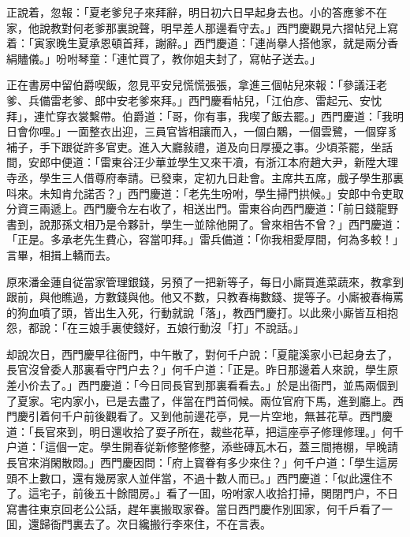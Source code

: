 正說着，忽報：「夏老爹兒子來拜辭，明日初六日早起身去也。小的答應爹不在家，他說教對何老爹那裏說聲，明早差人那邊看守去。」西門慶觀見六摺帖兒上寫着：「寅家晚生夏承恩頓首拜，謝辭。」西門慶道：「連尚擧人搭他家，就是兩分香絹贐儀。」吩咐琴童：「連忙買了，教你姐夫封了，寫帖子送去。」

正在書房中留伯爵喫飯，忽見平安兒慌慌張張，拿進三個帖兒來報：「參議汪老爹、兵備雷老爹、郎中安老爹來拜。」西門慶看帖兒，「江伯彦、雷起元、安忱拜」，連忙穿衣裳繫帶。伯爵道：「哥，你有事，我喫了飯去罷。」西門慶道：「我明日會你哩。」一面整衣出迎，三員官皆相讓而入，一個白鷴，一個雲鷺，一個穿豸補子，手下跟従許多官吏。進入大廳敍禮，道及向日厚擾之事。少頃茶罷，坐話間，安郎中便道：「雷東谷汪少華並學生又來干凟，有浙江本府趙大尹，新陞大理寺丞，學生三人借尊府奉請。已發柬，定初九日赴會。主席共五席，戲子學生那裏呌來。未知肯允諾否？」西門慶道：「老先生吩咐，學生掃門拱候。」安郎中令吏取分資三兩遞上。西門慶令左右收了，相送出門。雷東谷向西門慶道：「前日錢龍野書到，說那孫文相乃是令夥計，學生一並除他開了。曾來相告不曾？」西門慶道：「正是。多承老先生費心，容當叩拜。」雷兵備道：「你我相愛厚間，何為多較！」言畢，相揖上轎而去。

原來潘金蓮自従當家管理銀錢，另預了一把新等子，每日小廝買進菜蔬來，教拿到跟前，與他瞧過，方數錢與他。他又不數，只教春梅數錢、提等子。小廝被春梅罵的狗血噴了頭，皆出生入死，行動就說「落」，教西門慶打。以此衆小廝皆互相抱怨，都說：「在三娘手裏使錢好，五娘行動沒「打」不說話。」

却說次日，西門慶早往衙門，中午散了，對何千户說：「夏龍溪家小已起身去了，長官沒曾委人那裏看守門户去？」何千户道：「正是。昨日那邊着人來說，學生原差小价去了。」西門慶道：「今日同長官到那裏看看去。」於是出衙門，並馬兩個到了夏家。宅内家小，已是去盡了，伴當在門首伺候。兩位官府下馬，進到廳上。西門慶引着何千户前後觀看了。又到他前邊花亭，見一片空地，無甚花草。西門慶道：「長官來到，明日還收拾了耍子所在，裁些花草，把這座亭子修理修理。」何千户道：「這個一定。學生開春従新修整修整，添些磚瓦木石，蓋三間捲棚，早晚請長官來消閑散悶。」西門慶因問：「府上寳眷有多少來住？」何千户道：「學生這房頭不上數口，還有幾房家人並伴當，不過十數人而已。」西門慶道：「似此還住不了。這宅子，前後五十餘間房。」看了一囬，吩咐家人收拾打掃，関閉門户，不日寫書往東京回老公公話，趕年裏搬取家眷。當日西門慶作別囬家，何千戶看了一囬，還歸衙門裏去了。次日纔搬行李來住，不在言表。

